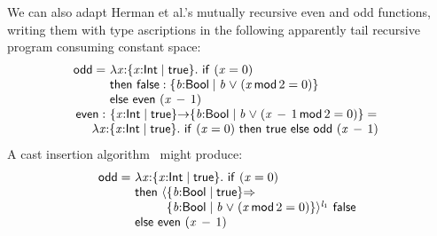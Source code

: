 \documentclass[9pt]{extarticle}
\newcommand{\ottnt}[1]{\mathit{#1}}
\newcommand{\ottsym}[1]{#1}
\begin{document}
{\iffull

  We can also adapt Herman et al.'s mutually recursive even and odd
  functions, writing them with type ascriptions in the following
  apparently tail recursive program consuming constant space:
\[ \begin{array}{@{}r@{~}l} 
   \mathsf{odd}  = &   \lambda \mathit{x} \mathord{:}  \{ \mathit{x} \mathord{:}  \mathsf{Int}  \mathrel{\mid}  \mathsf{true}  \}  .~   \mathsf{if}~  (  \mathit{x}  \mathrel{=}  \ottsym{0}  )   \\ & \mathsf{then}~   \mathsf{false}   :   \{ \mathit{b} \mathord{:}  \mathsf{Bool}  \mathrel{\mid}  \mathit{b}  \mathrel{\vee}   (  \mathit{x} \,  \mathsf{mod}  \, \ottsym{2}  \mathrel{=}  \ottsym{0}  )   \}    \\ & \mathsf{else}~  \mathsf{even}    ~  ( \mathit{x} \,  -  \, \ottsym{1} )   \\
   \mathsf{even}  : &   \{ \mathit{x} \mathord{:}  \mathsf{Int}  \mathrel{\mid}  \mathsf{true}  \}  \mathord{ \rightarrow }  \{ \mathit{b} \mathord{:}  \mathsf{Bool}  \mathrel{\mid}  \mathit{b}  \mathrel{\vee}   (  \mathit{x} \,  -  \, \ottsym{1} \,  \mathsf{mod}  \, \ottsym{2}  \mathrel{=}  \ottsym{0}  )   \}   = {} \\
  \multicolumn{2}{l}{\quad   \lambda \mathit{x} \mathord{:}  \{ \mathit{x} \mathord{:}  \mathsf{Int}  \mathrel{\mid}  \mathsf{true}  \}  .~   \mathsf{if}~  (  \mathit{x}  \mathrel{=}  \ottsym{0}  )  ~\mathsf{then}~  \mathsf{true}  ~\mathsf{else}~  \mathsf{odd}    ~  ( \mathit{x} \,  -  \, \ottsym{1} )  }
\end{array} \]
A cast insertion algorithm~\cite{Swamy09coercions} might produce:
\[ \begin{array}{@{}r@{~}l} 
   \mathsf{odd}  = &   \lambda \mathit{x} \mathord{:}  \{ \mathit{x} \mathord{:}  \mathsf{Int}  \mathrel{\mid}  \mathsf{true}  \}  .~   \mathsf{if}~  (  \mathit{x}  \mathrel{=}  \ottsym{0}  )   \\ & \mathsf{then}~  \langle   \{ \mathit{b} \mathord{:}  \mathsf{Bool}  \mathrel{\mid}  \mathsf{true}  \}   \mathord{ \overset{    }{\Rightarrow} }  {} \\  &  \phantom{\mathsf{then}~}  \phantom{\langle}   \{ \mathit{b} \mathord{:}  \mathsf{Bool}  \mathrel{\mid}  \mathit{b}  \mathrel{\vee}   (  \mathit{x} \,  \mathsf{mod}  \, \ottsym{2}  \mathrel{=}  \ottsym{0}  )   \}   \rangle^{ \ottnt{l_{{\mathrm{1}}}} } ~   \mathsf{false}    \\ & \mathsf{else}~  \mathsf{even}    ~  ( \mathit{x} \,  -  \, \ottsym{1} )   \\

\end{array}\]}
\end{document}
